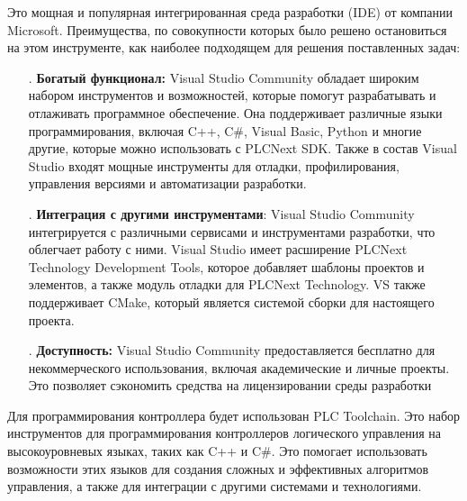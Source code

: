 {	\par \redline Это мощная и популярная интегрированная среда разработки (IDE) от компании Microsoft. Преимущества, по совокупности которых было решено остановиться на этом инструменте, как наиболее подходящем для решения поставленных задач:
	
	\begin{itemize}[leftmargin=2.15cm, labelwidth=0.65cm, labelsep=0.0cm] 
		
		\item[\theitemcntr. ]	\textbf{Богатый функционал:} Visual Studio Community обладает широким набором инструментов и возможностей, которые помогут разрабатывать и отлаживать программное обеспечение. Она поддерживает различные языки программирования, включая C++, C\#, Visual Basic, Python и многие другие, которые можно использовать с PLCNext SDK. Также в состав Visual Studio входят мощные инструменты для отладки, профилирования, управления версиями и автоматизации разработки.
		\addtocounter{itemcntr}{1}
		
		\item[\theitemcntr. ] 	\textbf{Интеграция с другими инструментами}: Visual Studio Community интегрируется с различными сервисами и инструментами разработки, что облегчает работу с ними. Visual Studio имеет расширение PLCNext Technology Development Tools, которое добавляет шаблоны проектов и элементов, а также модуль отладки для PLCNext Technology. VS также поддерживает CMake, который является системой сборки для настоящего проекта.
		
		\addtocounter{itemcntr}{1}
		
		\item[\theitemcntr. ] 	\textbf{Доступность:} Visual Studio Community предоставляется бесплатно для некоммерческого использования, включая академические и личные проекты. Это позволяет сэкономить средства на лицензировании среды разработки
		
		\addtocounter{itemcntr}{1}
		
		\setcounter{itemcntr}{1}
	\end{itemize} 	
	
	\par \redline Для программирования контроллера будет использован PLC Toolchain. Это набор инструментов для программирования контроллеров логического управления на высокоуровневых языках, таких как C++ и C\#. Это помогает использовать возможности этих языков для создания сложных и эффективных алгоритмов управления, а также для интеграции с другими системами и технологиями.
	
}
